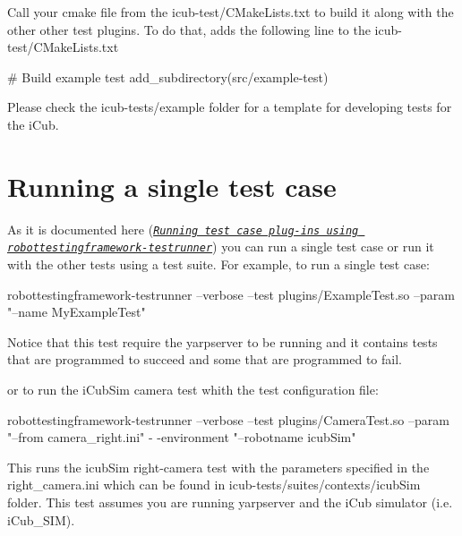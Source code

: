 Call your cmake file from the {\ttfamily icub-\/test/\+C\+Make\+Lists.\+txt} to build it along with the other other test plugins. To do that, adds the following line to the {\ttfamily icub-\/test/\+C\+Make\+Lists.\+txt}


\begin{DoxyCode}
\textcolor{preprocessor}{# Build example test}
\textcolor{preprocessor}{add\_subdirectory(src/example-test)}
\end{DoxyCode}


Please check the {\ttfamily icub-\/tests/example} folder for a template for developing tests for the i\+Cub.\hypertarget{writing-and-running_running_single_test_case}{}\section{Running a single test case}\label{writing-and-running_running_single_test_case}
As it is documented here (\href{http://robotology.github.io/robot-testing-framework/documentation/robottestingframework-testrunner.html}{\tt {\itshape Running test case plug-\/ins using robottestingframework-\/testrunner}}) you can run a single test case or run it with the other tests using a test suite. For example, to run a single test case\+:


\begin{DoxyCode}
robottestingframework-testrunner --verbose --test plugins/ExampleTest.so  --param \textcolor{stringliteral}{"--name MyExampleTest"}
\end{DoxyCode}


Notice that this test require the {\ttfamily yarpserver} to be running and it contains tests that are programmed to succeed and some that are programmed to fail.

or to run the i\+Cub\+Sim camera test whith the test configuration file\+:


\begin{DoxyCode}
robottestingframework-testrunner --verbose --test plugins/CameraTest.so --param \textcolor{stringliteral}{"--from camera\_right.ini"} -
      -environment \textcolor{stringliteral}{"--robotname icubSim"}
\end{DoxyCode}


This runs the icub\+Sim right-\/camera test with the parameters specified in the {\ttfamily right\+\_\+camera.\+ini} which can be found in {\ttfamily icub-\/tests/suites/contexts/icub\+Sim} folder. This test assumes you are running {\ttfamily yarpserver} and the i\+Cub simulator (i.\+e. {\ttfamily i\+Cub\+\_\+\+S\+IM}).

